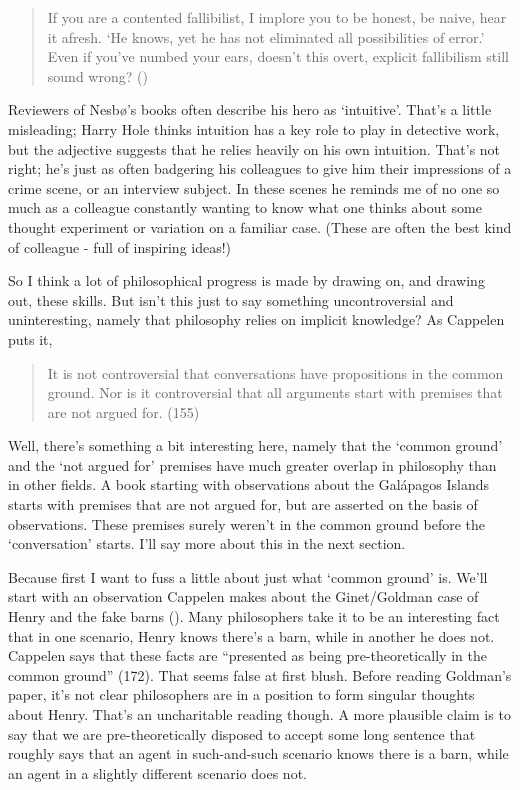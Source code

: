 \documentclass[
  11pt,
  letterpaper,
  DIV=11,
  numbers=noendperiod,
  twoside]{scrartcl}
\begin{document}
\begin{quote}
If you are a contented fallibilist, I implore you to be honest, be
naive, hear it afresh. `He knows, yet he has not eliminated all
possibilities of error.' Even if you've numbed your ears, doesn't this
overt, explicit fallibilism still sound wrong?
()
\end{quote}

Reviewers of Nesbø's books often describe his hero as `intuitive'.
That's a little misleading; Harry Hole thinks intuition has a key role
to play in detective work, but the adjective suggests that he relies
heavily on his own intuition. That's not right; he's just as often
badgering his colleagues to give him their impressions of a crime scene,
or an interview subject. In these scenes he reminds me of no one so much
as a colleague constantly wanting to know what one thinks about some
thought experiment or variation on a familiar case. (These are often the
best kind of colleague - full of inspiring ideas!)

So I think a lot of philosophical progress is made by drawing on, and
drawing out, these skills. But isn't this just to say something
uncontroversial and uninteresting, namely that philosophy relies on
implicit knowledge? As Cappelen puts it,

\begin{quote}
It is not controversial that conversations have propositions in the
common ground. Nor is it controversial that all arguments start with
premises that are not argued for. (155)
\end{quote}

Well, there's something a bit interesting here, namely that the `common
ground' and the `not argued for' premises have much greater overlap in
philosophy than in other fields. A book starting with observations about
the Galápagos Islands starts with premises that are not argued for, but
are asserted on the basis of observations. These premises surely weren't
in the common ground before the `conversation' starts. I'll say more
about this in the next section.

Because first I want to fuss a little about just what `common ground'
is. We'll start with an observation Cappelen makes about the
Ginet/Goldman case of Henry and the fake barns
(). Many philosophers take it to
be an interesting fact that in one scenario, Henry knows there's a barn,
while in another he does not. Cappelen says that these facts are
``presented as being pre-theoretically in the common ground'' (172).
That seems false at first blush. Before reading Goldman's paper, it's
not clear philosophers are in a position to form singular thoughts about
Henry. That's an uncharitable reading though. A more plausible claim is
to say that we are pre-theoretically disposed to accept some long
sentence that roughly says that an agent in such-and-such scenario knows
there is a barn, while an agent in a slightly different scenario does
not.
\end{document}
